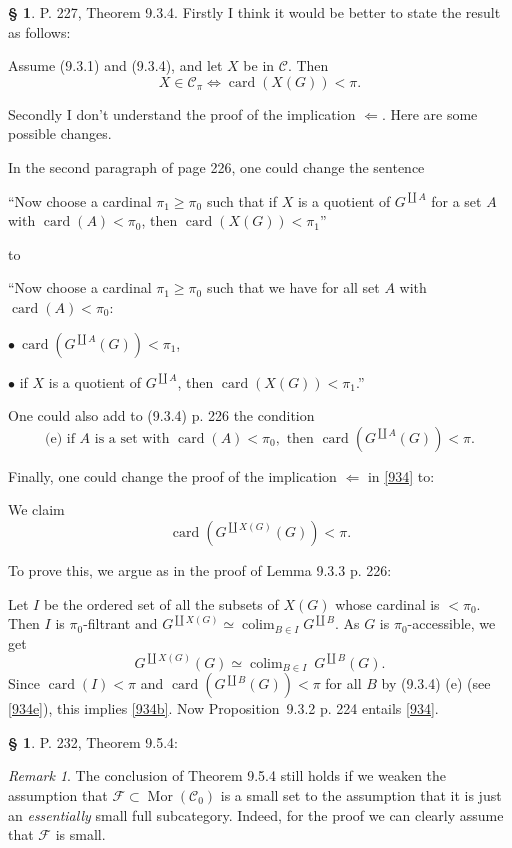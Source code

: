 \documentclass[12pt]{article}
\theoremstyle{remark}
\newtheorem{rk}[thm]{Remark}
\theoremstyle{definition}
\newtheorem{s}[thm]{\S}
\newcommand{\bu}{\bullet}
\newcommand{\cc}{\mathcal}
\newcommand{\C}{\mathcal C}
\DeclareMathOperator*{\co}{colim}
\DeclareMathOperator{\card}{card}%
\DeclareMathOperator{\Mor}{Mor}
\begin{document}
\begin{s} 
P. 227, Theorem 9.3.4. Firstly I think it would be better to state the result as follows:

Assume (9.3.1) and (9.3.4), and let $X$ be in $\C$. Then 
\begin{equation}\label{934}
X\in\C_\pi\iff\card(X(G))<\pi.
\end{equation} 

Secondly I don't understand the proof of the implication $\Leftarrow$. Here are some possible changes. 

In the second paragraph of page 226, one could change the sentence 

``Now choose a cardinal $\pi_1\ge\pi_0$ such that if $X$ is a quotient of $G^{\coprod A}$ for a set $A$ with $\card(A)<\pi_0$, then $\card(X(G))<\pi_1$''

\noindent to 

``Now choose a cardinal $\pi_1\ge\pi_0$ such that we have for all set $A$ with $\card(A)<\pi_0$: 

$\bu\ \card(G^{\coprod A}(G))<\pi_1$, 

$\bu$ if $X$ is a quotient of $G^{\coprod A}$, then $\card(X(G))<\pi_1$.'' 

One could also add to (9.3.4) p. 226 the condition 
\begin{equation}\label{934e}
\text{(e) if }A\text{ is a set with }\card(A)<\pi_0,\text{ then }\card(G^{\coprod A}(G))<\pi.
\end{equation}

Finally, one could change the proof of the implication $\Leftarrow$ in \eqref{934} to: 

We claim
\begin{equation}\label{934b}
\card(G^{\coprod X(G)}(G))<\pi.
\end{equation} 

To prove this, we argue as in the proof of Lemma 9.3.3 p. 226: 

Let $I$ be the ordered set of all the subsets of $X(G)$ whose cardinal is $<\pi_0$. Then $I$ is $\pi_0$-filtrant and $G^{\coprod X(G)}\simeq\co_{B\in I}G^{\coprod B}$. As $G$ is $\pi_0$-accessible, we get 
$$
G^{\coprod X(G)}(G)\simeq\co_{B\in I}\ G^{\coprod B}(G).
$$ 
Since $\card(I)<\pi$ and $\card(G^{\coprod B}(G))<\pi$ for all $B$ by (9.3.4) (e) (see \eqref{934e}), this implies \eqref{934b}. Now Proposition~9.3.2 p. 224 entails \eqref{934}.
\end{s}
%
%
\begin{s} 
P. 232, Theorem 9.5.4: 
\begin{rk}\label{954}
The conclusion of Theorem 9.5.4 still holds if we weaken the assumption that $\cc F\subset\Mor(\C_0)$ is a small set to the assumption that it is just an {\em essentially} small full subcategory. Indeed, for the proof we can clearly assume that $\cc F$ is small. 
\end{rk}
\end{s}
\end{document}
